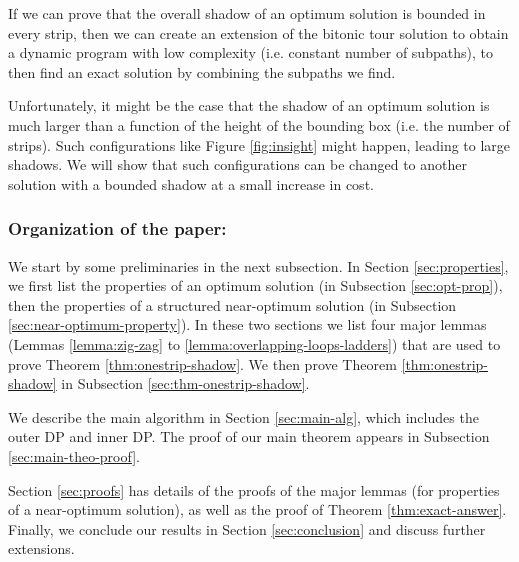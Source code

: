 \documentclass[10pt,a4paper]{amsart}
\theoremstyle{thmstyleone}
\newcommand{\tw}{\textwidth}
\begin{document}
If we can prove that the overall shadow of an optimum solution is bounded in every strip, then we can create an extension of the bitonic tour solution to obtain a dynamic program with low complexity (i.e. constant number of subpaths), to then find an exact solution by combining the subpaths we find.


Unfortunately, it might be the case that the shadow of an optimum solution is much larger than a function of the height of the bounding box (i.e. the number of strips). Such configurations like Figure \ref{fig:insight} might happen, leading to large shadows. We will show that such configurations can be changed to another solution with a bounded shadow at a small increase in cost.


\subsubsection*{Organization of the paper:} 

We start by some preliminaries in the next subsection. 
In Section \ref{sec:properties}, we first list the properties of an optimum solution (in Subsection \ref{sec:opt-prop}), then the properties of a structured near-optimum solution (in Subsection \ref{sec:near-optimum-property}). In these two sections we list four major lemmas (Lemmas \ref{lemma:zig-zag} to \ref{lemma:overlapping-loops-ladders}) that are used
to prove Theorem \ref{thm:onestrip-shadow}.
We then prove Theorem \ref{thm:onestrip-shadow} in Subsection \ref{sec:thm-onestrip-shadow}. 

We describe the main algorithm in Section \ref{sec:main-alg},
which includes the outer DP and inner DP. The proof of our main theorem appears in Subsection \ref{sec:main-theo-proof}.

Section \ref{sec:proofs} has details of the proofs of the major lemmas (for properties of a near-optimum solution), as well as the proof of Theorem \ref{thm:exact-answer}.
Finally, we conclude our results in Section \ref{sec:conclusion} and discuss further extensions.


\end{document}
